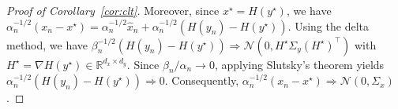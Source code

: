 \documentclass[11pt]{article}
\theoremstyle{plain}
\theoremstyle{definition}
\def\NM{{\mathcal N}}
\def\RB{{\mathbb R}}
\newcommand{\xhat}{{\hat{x}}}
\newcommand{\yhat}{{\hat{y}}}
\newcommand{\zcheck}{{\check{z}}}
\newcommand{\xx}{{x}}
\newcommand{\yy}{{y}}
\def\weakconverge{\Rightarrow}
\begin{document}
\begin{appendix}
\begin{proof}[Proof of Corollary~\ref{cor:clt}]
    
    Moreover, since $\xx^\star = H(\yy^\star)$,  we have $\alpha_{n}^{-1/2} (\xx_{n} - \xx^\star) = \alpha_{n}^{-1/2} \xhat_{n} + \alpha_{n}^{-1/2} (H(\yy_n) - H(\yy^\star))$.
    Using the delta method, we have $\beta_{n}^{-1/2} (H(\yy_{n}) - H(\yy^\star)) \weakconverge \NM(0, H^\star \Sigma_y (H^\star)^\top ) $ with $H^\star = \nabla H(\yy^\star) \in \RB^{d_x \times d_y}$.
    Since $\beta_{n} / \alpha_{n} \to 0$,  applying Slutsky's theorem yields $\alpha_{n}^{-1/2} (H(\yy_n) - H(\yy^\star)) \weakconverge 0 $. Consequently, $\alpha_{n}^{-1/2} (\xx_{n} - \xx^\star) \weakconverge \NM(0, \Sigma_{x})$.
\end{proof}%
\end{appendix}




\end{document}
